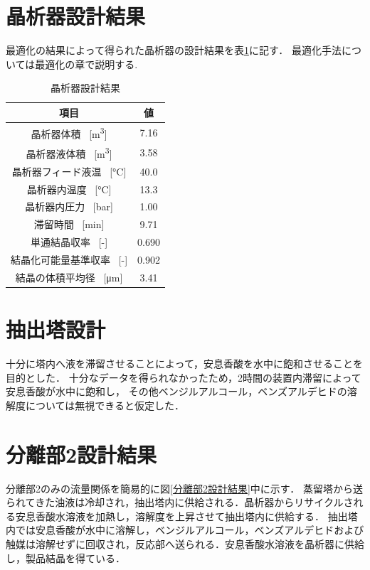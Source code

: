 \documentclass[a4j]{jsreport}
\begin{document}
\section{晶析器設計結果}
最適化の結果によって得られた晶析器の設計結果を表\ref{晶析器設計結果}に記す．
最適化手法については最適化の章で説明する.
\clearpage
\begin{table}[htbp]
  \centering
  \caption{晶析器設計結果}
  \label{晶析器設計結果}
  \begin{tabular}{cc}
    \hline
    項目 & 値 \\
    \hline
    晶析器体積 \, [\si{\cubic \metre}] &7.16 \\
    晶析器液体積 \, [\si{\cubic \metre}] &3.58 \\
    晶析器フィード液温 \, [\si{\degreeCelsius}] & 40.0 \\
    晶析器内温度 \, [\si{\degreeCelsius}] &13.3 \\
    晶析器内圧力 \, [\si{bar}] &1.00 \\
    滞留時間 \, [\si{min}] &9.71 \\
    単通結晶収率 \, [\si{-}] &0.690 \\
    結晶化可能量基準収率 \, [\si{-}] &0.902 \\
    結晶の体積平均径 \, [\si{\micro \metre}] &3.41 \\
    \hline
  \end{tabular}
\end{table}

\section{抽出塔設計}
十分に塔内へ液を滞留させることによって，安息香酸を水中に飽和させることを目的とした．
十分なデータを得られなかったため，2時間の装置内滞留によって安息香酸が水中に飽和し，
その他ベンジルアルコール，ベンズアルデヒドの溶解度については無視できると仮定した．

\section{分離部2設計結果}
分離部2のみの流量関係を簡易的に図\ref{分離部2設計結果}中に示す．
蒸留塔から送られてきた油液は冷却され，抽出塔内に供給される．晶析器からリサイクルされる安息香酸水溶液を加熱し，溶解度を上昇させて抽出塔内に供給する．
抽出塔内では安息香酸が水中に溶解し，ベンジルアルコール，ベンズアルデヒドおよび触媒は溶解せずに回収され，反応部へ送られる．安息香酸水溶液を晶析器に供給し，製品結晶を得ている．
\end{document}
